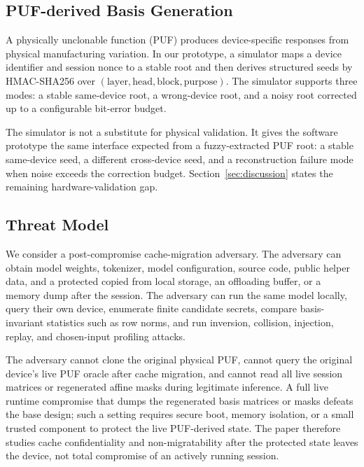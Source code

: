 \subsection{PUF-derived Basis Generation}

A physically unclonable function (PUF) produces device-specific responses from physical manufacturing variation. In our prototype, a simulator maps a device identifier and session nonce to a stable root and then derives structured seeds by HMAC-SHA256 over $(\mathrm{layer},\mathrm{head},\mathrm{block},\mathrm{purpose})$. The simulator supports three modes: a stable same-device root, a wrong-device root, and a noisy root corrected up to a configurable bit-error budget.

The simulator is not a substitute for physical validation. It gives the software prototype the same interface expected from a fuzzy-extracted PUF root: a stable same-device seed, a different cross-device seed, and a reconstruction failure mode when noise exceeds the correction budget. Section~\ref{sec:discussion} states the remaining hardware-validation gap.

\subsection{Threat Model}

We consider a post-compromise cache-migration adversary. The adversary can obtain model weights, tokenizer, model configuration, source code, public helper data, and a protected \kv{} copied from local storage, an offloading buffer, or a memory dump after the session. The adversary can run the same model locally, query their own device, enumerate finite candidate secrets, compare basis-invariant statistics such as row norms, and run inversion, collision, injection, replay, and chosen-input profiling attacks.

The adversary cannot clone the original physical PUF, cannot query the original device's live PUF oracle after cache migration, and cannot read all live session matrices or regenerated affine masks during legitimate inference. A full live runtime compromise that dumps the regenerated basis matrices or masks defeats the base design; such a setting requires secure boot, memory isolation, or a small trusted component to protect the live PUF-derived state. The paper therefore studies cache confidentiality and non-migratability after the protected state leaves the device, not total compromise of an actively running session.

